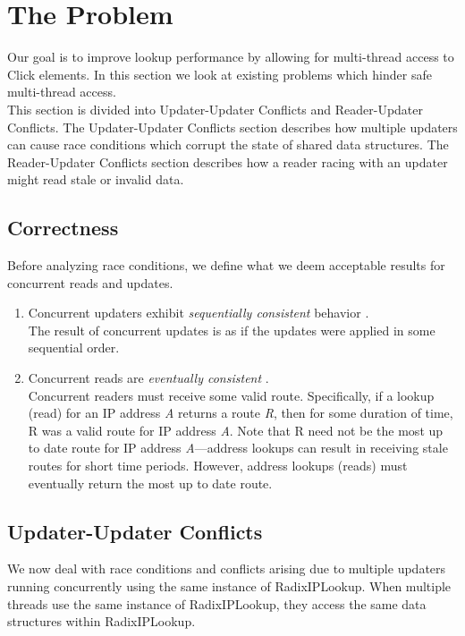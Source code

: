\documentclass[a4paper]{article}
\begin{document}
\pagebreak
\section{The Problem}
\label{sec:problem}
Our goal is to improve lookup performance by allowing for multi-thread
access to Click elements. In this section we look at existing problems
which hinder safe multi-thread access.\\

This section is divided into Updater-Updater Conflicts and
Reader-Updater Conflicts. The Updater-Updater Conflicts section
describes how multiple updaters can cause race conditions which
corrupt the state of shared data structures. The Reader-Updater
Conflicts section describes how a reader racing with an updater might
read stale or invalid data.

\subsection{Correctness}
\label{sec:correctness}
Before analyzing race conditions, we define what we deem acceptable results for concurrent reads and updates.
\begin{enumerate}
\item Concurrent updaters exhibit \emph{sequentially consistent} behavior \cite{seqconsistency}.\\ The result of concurrent updates is as if the updates were applied in some sequential order.
\item Concurrent reads are \emph{eventually consistent} \cite{eventualconsistency}.\\ Concurrent readers must receive some valid route. Specifically, if a lookup (read) for an IP address \emph{A} returns a route \emph{R}, then for some duration of time, R was a valid route for IP address \emph{A}. Note that R need not be the most up to date route for IP address \emph{A}---address lookups can result in receiving stale routes for short time periods. However, address lookups (reads) must eventually return the most up to date route.

\end{enumerate} 
\subsection{Updater-Updater Conflicts}
We now deal with race conditions and conflicts arising due to multiple updaters running concurrently using the same instance of RadixIPLookup. When multiple threads use the same instance of RadixIPLookup, they access the same data structures within RadixIPLookup.
\end{document}
